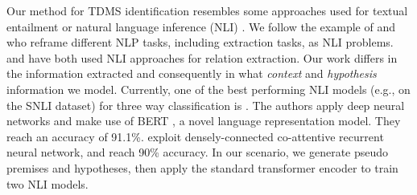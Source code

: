 \documentclass[11pt,a4paper]{article}
\newcommand{\fb}[1]{[FB:#1]}
\begin{document}
Our method for TDMS identification resembles some approaches used for textual entailment \cite{dagan:etal:06} or natural language inference (NLI) \cite{snli:emnlp2015}.
We follow the example of \citet{white:etal:17} and \citet{poliak:etal:18} who reframe different NLP tasks, including extraction tasks, as NLI problems.
\citet{eichler:etal:17} and \citet{obamuyide:vlachos:18} have both used NLI approaches for relation extraction.
Our work differs in the information extracted and consequently in what \emph{context} and \emph{hypothesis} information we model.
Currently, one of the best performing NLI models (e.g., on the SNLI dataset) for three way classification is \cite{DBLP:journals/corr/abs-1901-11504}. The authors apply deep neural networks and make use of BERT \cite{BERT}, a novel language representation model. They reach an accuracy of 91.1\%. \citet{DBLP:journals/corr/abs-1805-11360} exploit densely-connected co-attentive recurrent neural network, and reach 90\% accuracy. 
In our scenario, we generate pseudo 
premises and hypotheses, then apply the standard transformer encoder \cite{ashish17,BERT} to train two NLI models.

\begin{comment}
\paragraph{\textbf{Automatic leaderboard construction}}
\fb{@all decide in the end if keep this part of no}
The final aim of our research line is the automatic construction of leaderboards in the NLP domain. Some efforts have been done in keeping an account of research activities either manually by individual researchers\footnote{\url{https://github.com/sebastianruder/NLP-progress}} or in a moderate crowdsourced fashion by organizations\footnote{\url{https://paperswithcode.com/}}. However, to the best of our knowledge, our work is the first attempt towards the creation of NLP Leaderboards in an automatic fashion. \citet{Blum2015} have tackled the issue from a different perspective: the authors propose an evaluation metric for machine learning competitions that faithfully represents the quality of the best submission. Our interest, instead, is extracting information reported in papers in order to build leaderboard based on such results.
\end{comment}
 
\begin{comment}
To summarise: differently from all the previous approaches, we: \textit{1)} extract information from the entire article, not only abstracts; \textit{2)} we provide a method for extracting the \textit{score} of a paper, in addition to \textit{task, dataset} and \textit{metric}; \textit{3)} we propose a framework inspired on textual entailment;
 \textit{4)} we exploit the information of the tables, that include essential information on the papers' score. 
\end{comment}
\end{document}
